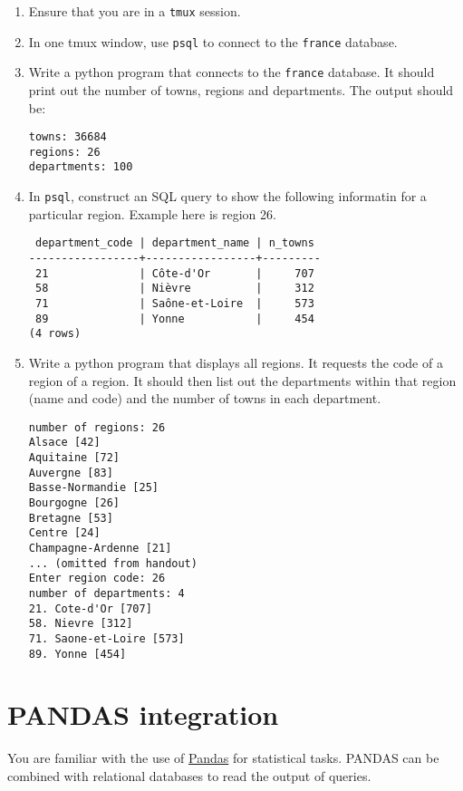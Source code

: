 \begin{enumerate}

\item Ensure that you are in a \texttt{tmux} session.
  
\item In one tmux window, use \texttt{psql} to connect to the \texttt{france} database.

\item Write a python program that connects to the \texttt{france} database.
  It should print out the number of towns, regions and departments.
  The output should be: 
\begin{verbatim}
towns: 36684
regions: 26
departments: 100
\end{verbatim}

\item In \texttt{psql}, construct an SQL query to show the following informatin for a particular region.
  Example here is region 26.
\begin{verbatim}
 department_code | department_name | n_towns 
-----------------+-----------------+---------
 21              | Côte-d'Or       |     707
 58              | Nièvre          |     312
 71              | Saône-et-Loire  |     573
 89              | Yonne           |     454
(4 rows)
\end{verbatim}

\item Write a python program that displays all regions.
  It requests the code of a region of a region.
  It should then list out the departments within that region (name and code) and the number of towns in each department.
\begin{verbatim}
number of regions: 26
Alsace [42]
Aquitaine [72]
Auvergne [83]
Basse-Normandie [25]
Bourgogne [26]
Bretagne [53]
Centre [24]
Champagne-Ardenne [21]
... (omitted from handout)
Enter region code: 26
number of departments: 4
21. Cote-d'Or [707]
58. Nievre [312]
71. Saone-et-Loire [573]
89. Yonne [454]
\end{verbatim}

\end{enumerate}
  

\section{PANDAS integration}
\label{sec:pandas-integration}

You are familiar with the use of
\href{https://pandas.pydata.org/}{Pandas} for statistical tasks. PANDAS
can be combined with relational databases to read the output of queries.

